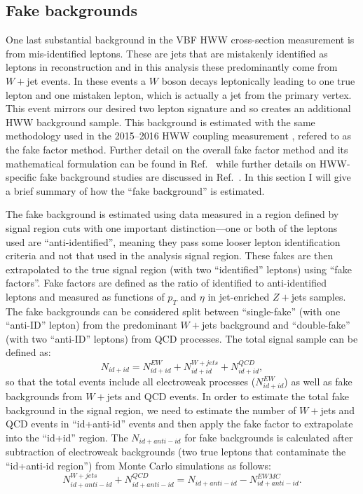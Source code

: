 \subsection{Fake backgrounds}
One last substantial background in the VBF HWW cross-section measurement is from mis-identified leptons. These are jets that are mistakenly identified as leptons in reconstruction and in this analysis these predominantly come from $W+$jet events. In these events a $W$ boson decays leptonically leading to one true lepton and one mistaken lepton, which is actually a jet from the primary vertex. This event mirrors our desired two lepton signature and so creates an additional HWW background sample. This background is estimated with the same methodology used in the 2015--2016 HWW coupling measurement \cite{Aaboud_2019},  refered to as the fake factor method. Further detail on the overall fake factor method and its mathematical formulation can be found in Ref.~\cite{fakefactormethod} while further details on HWW-specific fake background studies are discussed in Ref.~\cite{Aaboud_2019}. In this section I will give a brief summary of how the ``fake background'' is estimated. 

The fake background is estimated using data measured in a region defined by signal region cuts with one important distinction---one or both of the leptons used are ``anti-identified'', meaning they pass some looser lepton identification criteria and not that used in the analysis signal region. These fakes are then extrapolated to the true signal region (with two ``identified'' leptons) using ``fake factors''. Fake factors are defined as the ratio of identified to anti-identified leptons and measured as functions of $p_T$ and $\eta$ in jet-enriched $Z+$jets samples. The fake backgrounds can be considered split between ``single-fake'' (with one ``anti-ID'' lepton) from the predominant $W+$jets background and ``double-fake'' (with two ``anti-ID'' leptons) from QCD processes. The total signal sample can be defined as: 
\begin{equation}
N_{id+id} = N^{EW}_{id+id}+N^{W+jets}_{id+id}+N^{QCD}_{id+id},
\end{equation} 
so that the total events include all electroweak processes ($N^{EW}_{id+id}$) as well as fake backgrounds from $W+$jets and QCD events. In order to estimate the total fake background in the signal region, we need to estimate the number of $W+$jets and QCD events in ``id+anti-id'' events and then apply the fake factor to extrapolate into the ``id+id'' region. The $N_{id+anti-id}$ for fake backgrounds is calculated after subtraction of electroweak backgrounds (two true leptons that contaminate the ``id+anti-id region'') from Monte Carlo simulations as follows:
\begin{equation}
N^{W+jets}_{id+anti-id}+N^{QCD}_{id+anti-id}=N_{id+anti-id}-N^{EW MC}_{id+anti-id}.
\end{equation}
 
